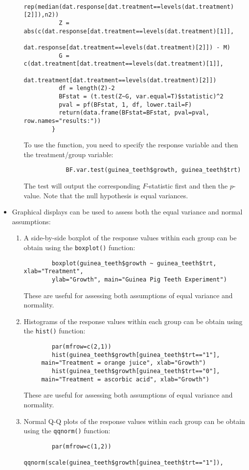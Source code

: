 \documentclass[11pt]{article}
\begin{document}
\begin{itemize}
\begin{enumerate}
\begin{verbatim}
		        rep(median(dat.response[dat.treatment==levels(dat.treatment)[2]]),n2))
		  Z = abs(c(dat.response[dat.treatment==levels(dat.treatment)[1]], 
		            dat.response[dat.treatment==levels(dat.treatment)[2]]) - M)
		  G = c(dat.treatment[dat.treatment==levels(dat.treatment)[1]], 
		        dat.treatment[dat.treatment==levels(dat.treatment)[2]])
		  df = length(Z)-2
		  BFstat = (t.test(Z~G, var.equal=T)$statistic)^2
		  pval = pf(BFstat, 1, df, lower.tail=F)
		  return(data.frame(BFstat=BFstat, pval=pval, row.names="results:"))
		}			
		\end{verbatim}
		To use the function, you need to specify the response variable and then the treatment/group variable:
		\begin{verbatim}
			BF.var.test(guinea_teeth$growth, guinea_teeth$trt)
		\end{verbatim}
		The test will output the corresponding $F$-statistic first and then the $p$-value. Note that the null hypothesis is equal variances.
	\end{enumerate}
	\item Graphical displays can be used to assess both the equal variance and normal assumptions:
	\begin{enumerate}
		\item A side-by-side boxplot of the response values within each group can be obtain using the \texttt{boxplot()} function:
		\begin{verbatim}
		boxplot(guinea_teeth$growth ~ guinea_teeth$trt, xlab="Treatment", 
        ylab="Growth", main="Guinea Pig Teeth Experiment")
		\end{verbatim}
		These are useful for assessing both assumptions of equal variance and normality.
		\item Histograms of the response values within each group can be obtain using the \texttt{hist()} function:
		\begin{verbatim}
		par(mfrow=c(2,1))
		hist(guinea_teeth$growth[guinea_teeth$trt=="1"],
     main="Treatment = orange juice", xlab="Growth")
		hist(guinea_teeth$growth[guinea_teeth$trt=="0"],
     main="Treatment = ascorbic acid", xlab="Growth")
		\end{verbatim}
		These are useful for assessing both assumptions of equal variance and normality.
		\item Normal Q-Q plots of the response values within each group can be obtain using the \texttt{qqnorm()} function:
		\begin{verbatim}
		par(mfrow=c(1,2))
		qqnorm(scale(guinea_teeth$growth[guinea_teeth$trt=="1"]),

\end{verbatim}
\end{enumerate}
\end{itemize}
\end{document}
